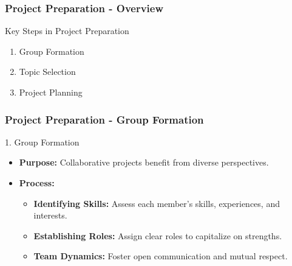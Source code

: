 \documentclass[aspectratio=169]{beamer}
\begin{document}
\begin{frame}[fragile]
    \frametitle{Project Preparation - Overview}
    \begin{block}{Key Steps in Project Preparation}
        \begin{enumerate}
            \item Group Formation
            \item Topic Selection
            \item Project Planning
        \end{enumerate}
    \end{block}
\end{frame}

\begin{frame}[fragile]
    \frametitle{Project Preparation - Group Formation}
    \begin{block}{1. Group Formation}
        \begin{itemize}
            \item \textbf{Purpose:} Collaborative projects benefit from diverse perspectives.
            \item \textbf{Process:}
            \begin{itemize}
                \item \textbf{Identifying Skills:} Assess each member's skills, experiences, and interests.
                \item \textbf{Establishing Roles:} Assign clear roles to capitalize on strengths.
                \item \textbf{Team Dynamics:} Foster open communication and mutual respect.
            \end{itemize}
        \end{itemize}
    \end{block}
\end{frame}
\end{document}
